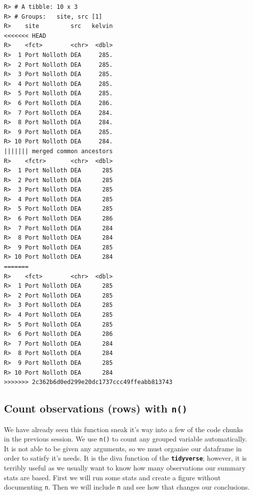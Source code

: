 \documentclass[]{book}
\theoremstyle{definition}
\theoremstyle{definition}
\theoremstyle{definition}
\theoremstyle{remark}
\begin{document}
\begin{verbatim}
R> # A tibble: 10 x 3
R> # Groups:   site, src [1]
R>    site         src   kelvin
<<<<<<< HEAD
R>    <fct>        <chr>  <dbl>
R>  1 Port Nolloth DEA     285.
R>  2 Port Nolloth DEA     285.
R>  3 Port Nolloth DEA     285.
R>  4 Port Nolloth DEA     285.
R>  5 Port Nolloth DEA     285.
R>  6 Port Nolloth DEA     286.
R>  7 Port Nolloth DEA     284.
R>  8 Port Nolloth DEA     284.
R>  9 Port Nolloth DEA     285.
R> 10 Port Nolloth DEA     284.
||||||| merged common ancestors
R>    <fctr>       <chr>  <dbl>
R>  1 Port Nolloth DEA      285
R>  2 Port Nolloth DEA      285
R>  3 Port Nolloth DEA      285
R>  4 Port Nolloth DEA      285
R>  5 Port Nolloth DEA      285
R>  6 Port Nolloth DEA      286
R>  7 Port Nolloth DEA      284
R>  8 Port Nolloth DEA      284
R>  9 Port Nolloth DEA      285
R> 10 Port Nolloth DEA      284
=======
R>    <fct>        <chr>  <dbl>
R>  1 Port Nolloth DEA      285
R>  2 Port Nolloth DEA      285
R>  3 Port Nolloth DEA      285
R>  4 Port Nolloth DEA      285
R>  5 Port Nolloth DEA      285
R>  6 Port Nolloth DEA      286
R>  7 Port Nolloth DEA      284
R>  8 Port Nolloth DEA      284
R>  9 Port Nolloth DEA      285
R> 10 Port Nolloth DEA      284
>>>>>>> 2c362b6d0ed299e20dc1737ccc49ffeabb813743
\end{verbatim}

\subsection{\texorpdfstring{Count observations (rows) with
\texttt{n()}}{Count observations (rows) with n()}}\label{count-observations-rows-with-n}

We have already seen this function sneak it's way into a few of the code
chunks in the previous session. We use \texttt{n()} to count any grouped
variable automatically. It is not able to be given any arguments, so we
must organise our dataframe in order to satisfy it's needs. It is the
diva function of the \textbf{\texttt{tidyverse}}; however, it is
terribly useful as we usually want to know how many observations our
summary stats are based. First we will run some stats and create a
figure without documenting \texttt{n}. Then we will include \texttt{n}
and see how that changes our conclusions.
\end{document}
